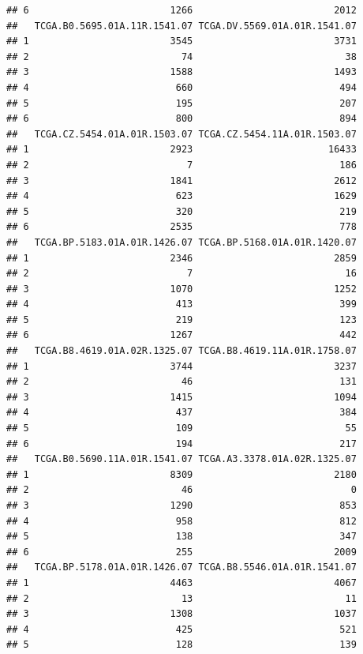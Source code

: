 \documentclass[
]{article}
\begin{document}
\begin{verbatim}
## 6                         1266                         2012
##   TCGA.B0.5695.01A.11R.1541.07 TCGA.DV.5569.01A.01R.1541.07
## 1                         3545                         3731
## 2                           74                           38
## 3                         1588                         1493
## 4                          660                          494
## 5                          195                          207
## 6                          800                          894
##   TCGA.CZ.5454.01A.01R.1503.07 TCGA.CZ.5454.11A.01R.1503.07
## 1                         2923                        16433
## 2                            7                          186
## 3                         1841                         2612
## 4                          623                         1629
## 5                          320                          219
## 6                         2535                          778
##   TCGA.BP.5183.01A.01R.1426.07 TCGA.BP.5168.01A.01R.1420.07
## 1                         2346                         2859
## 2                            7                           16
## 3                         1070                         1252
## 4                          413                          399
## 5                          219                          123
## 6                         1267                          442
##   TCGA.B8.4619.01A.02R.1325.07 TCGA.B8.4619.11A.01R.1758.07
## 1                         3744                         3237
## 2                           46                          131
## 3                         1415                         1094
## 4                          437                          384
## 5                          109                           55
## 6                          194                          217
##   TCGA.B0.5690.11A.01R.1541.07 TCGA.A3.3378.01A.02R.1325.07
## 1                         8309                         2180
## 2                           46                            0
## 3                         1290                          853
## 4                          958                          812
## 5                          138                          347
## 6                          255                         2009
##   TCGA.BP.5178.01A.01R.1426.07 TCGA.B8.5546.01A.01R.1541.07
## 1                         4463                         4067
## 2                           13                           11
## 3                         1308                         1037
## 4                          425                          521
## 5                          128                          139

\end{verbatim}
\end{document}

